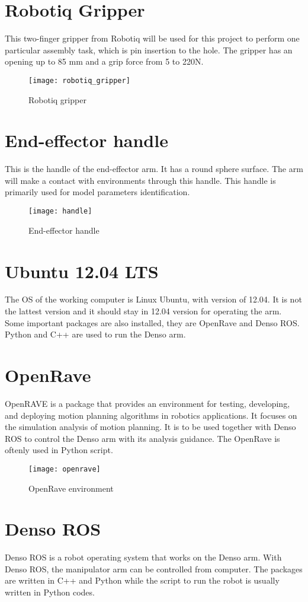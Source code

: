 \section{Robotiq Gripper}
This two-finger gripper from Robotiq will be used for this project to perform one particular assembly task, which is pin insertion to the hole. The gripper has an opening up to 85 mm and a grip force from 5 to 220N. 
\begin{figure}[H]
    \centering
    \texttt{[image: robotiq\_gripper]}
    \caption{Robotiq gripper}
    \label{fig:robotiq}
\end{figure}

\section{End-effector handle}
This is the handle of the end-effector arm. It has a round sphere surface. The arm will make a contact with environments through this handle. This handle is primarily used for model parameters identification.
\begin{figure}[H]
    \centering
    \texttt{[image: handle]}
    \caption{End-effector handle}
    \label{fig:end-effector}
\end{figure}

\section{Ubuntu 12.04 LTS}
The OS of the working computer is Linux Ubuntu, with version of 12.04. It is not the lattest version and it should stay in 12.04 version for operating the arm. Some important packages are also installed, they are OpenRave and Denso ROS. Python and C++ are used to run the Denso arm.

\section{OpenRave}
OpenRAVE is a package that provides an environment for testing, developing, and deploying motion planning algorithms in robotics applications. It focuses on the simulation analysis of motion planning. It is to be used together with Denso ROS to control the Denso arm with its analysis guidance. The OpenRave is oftenly used in Python script.
\begin{figure}[H]
    \centering
    \texttt{[image: openrave]}
    \caption{OpenRave environment}
    \label{fig:OpenRave}
\end{figure}
  
\section{Denso ROS}
Denso ROS is a robot operating system that works on the Denso arm. With Denso ROS, the manipulator arm can be controlled from computer. The packages are written in C++ and Python while the script to run the robot is usually written in Python codes.
